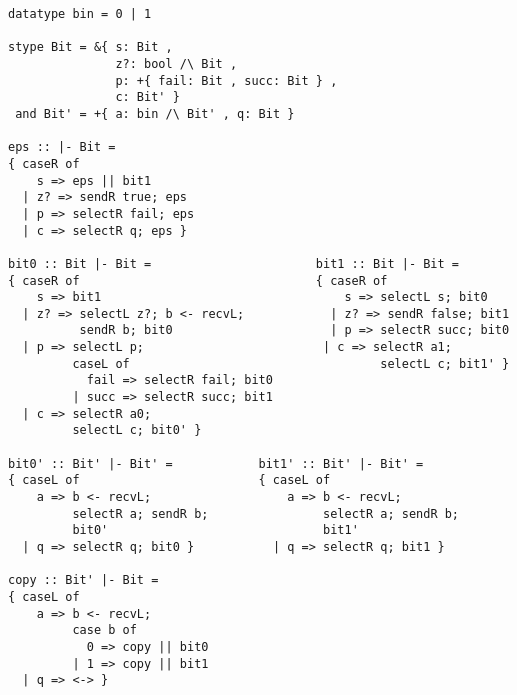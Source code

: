 \documentclass{article}
\begin{document}
\begin{verbatim}
datatype bin = 0 | 1

stype Bit = &{ s: Bit ,
               z?: bool /\ Bit ,
               p: +{ fail: Bit , succ: Bit } ,
               c: Bit' }
 and Bit' = +{ a: bin /\ Bit' , q: Bit }

eps :: |- Bit =
{ caseR of 
    s => eps || bit1
  | z? => sendR true; eps
  | p => selectR fail; eps
  | c => selectR q; eps }

bit0 :: Bit |- Bit =                       bit1 :: Bit |- Bit =       
{ caseR of                                 { caseR of                 
    s => bit1                                  s => selectL s; bit0
  | z? => selectL z?; b <- recvL;            | z? => sendR false; bit1
          sendR b; bit0                      | p => selectR succ; bit0
  | p => selectL p;                         | c => selectR a1;
         caseL of                                   selectL c; bit1' }
           fail => selectR fail; bit0
         | succ => selectR succ; bit1
  | c => selectR a0;
         selectL c; bit0' }

bit0' :: Bit' |- Bit' =            bit1' :: Bit' |- Bit' =    
{ caseL of                         { caseL of                 
    a => b <- recvL;                   a => b <- recvL;
         selectR a; sendR b;                selectR a; sendR b;
         bit0'                              bit1'
  | q => selectR q; bit0 }           | q => selectR q; bit1 }

copy :: Bit' |- Bit =
{ caseL of 
    a => b <- recvL;
         case b of
           0 => copy || bit0
         | 1 => copy || bit1
  | q => <-> }
\end{verbatim}


\section{}

\end{document}
